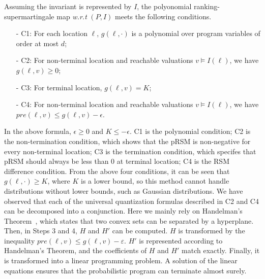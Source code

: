 \documentclass[runningheads]{llncs}
\newcommand\yx[1]{{\color{red} [YD: #1]}}
\begin{document}
Assuming the invariant is represented by $I$, the polyonomial ranking-supermartingale map \textit{w.r.t} $(P,I)$ meets the following conditions.
\begin{itemize}
	\item[-] C1: For each location $\ell$, $g(\ell,\cdot)$ is a polynomial over program variables of order at most $d$;
	\item[-] C2: For non-terminal location and reachable
	valuations $v \vDash I(\ell)$, we have $g(\ell,v) \geq 0$;
	\item[-] C3: For terminal location, $g(\ell,v)=K$;
	\item[-] C4: For non-terminal location and reachable
	valuations $v \vDash I(\ell)$, we have $pre(\ell,v) \leq g(\ell,v)-\epsilon$.
\end{itemize}
In the above formula, $\epsilon \geq 0$ and $K \leq -\epsilon$. C1 is the polynomial condition; C2 is the non-termination condition, which shows that the pRSM is non-negative for every non-terminal location; C3 is the termination condition, which specifes that pRSM should always be less than 0 at terminal location;
C4 is the RSM difference condition. From the above four conditions, it can be seen that $g(\ell,\cdot) \geq K$, where $K$ is a lower bound, so this method cannot handle distributions without lower bounds, such as Gaussian distributions.
We have observed that each of the universal quantization formulas described in C2 and C4 can be decomposed into a conjunction. Here we mainly rely on  Handelman's Theorem~\cite{Handelman1988}, which states that two convex sets can be separated by a hyperplane. Then, in Steps 3 and 4, $H$ and $H'$ can be computed. $H$ is transformed by the inequality $pre(\ell,v)\leq g(\ell,v)-\varepsilon$. $H'$ is represented according to Handelman's Theorem, and the coefficients of $H$ and $H'$ match exactly. Finally, it is transformed into a linear programming problem. %
A solution of the linear equations ensures that the probabilistic program can terminate almost surely.
\end{document}
